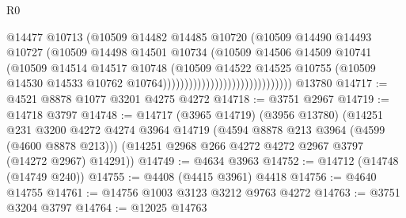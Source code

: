 \begin{lexlean}{R0}
\begin{coremodule}
                                                  @14477
                                                  @10713
                                                  (@10509
                                                    @14482
                                                    @14485
                                                    @10720
                                                    (@10509
                                                      @14490
                                                      @14493
                                                      @10727
                                                      (@10509
                                                        @14498
                                                        @14501
                                                        @10734
                                                        (@10509
                                                          @14506
                                                          @14509
                                                          @10741
                                                          (@10509
                                                            @14514
                                                            @14517
                                                            @10748
                                                            (@10509
                                                              @14522
                                                              @14525
                                                              @10755
                                                              (@10509
                                                                @14530
                                                                @14533
                                                                @10762
                                                                @10764))))))))))))))))))))))))))))))
    @13780
@14717 := @4521 @8878 @1077 @3201 @4275 @4272
@14718 := @3751 @2967
@14719 := @14718 @3797
@14748 := @14717
    (@3965 @14719)
    (@3956 @13780)
    (@14251
      @231
      @3200
      @4272
      @4274
      @3964
      @14719
      (@4594 @8878 @213 @3964 (@4599 (@4600 @8878 @213)))
      (@14251 @2968 @266 @4272 @4272 @2967 @3797 (@14272 @2967) @14291))
@14749 := @4634 @3963
@14752 := @14712 (@14748 (@14749 @240))
@14755 := @4408 (@4415 @3961) @4418
@14756 := @4640 @14755
@14761 := @14756 @1003 @3123 @3212 @9763 @4272
@14763 := @3751 @3204 @3797
@14764 := @12025 @14763

\end{coremodule}
\end{lexlean}
